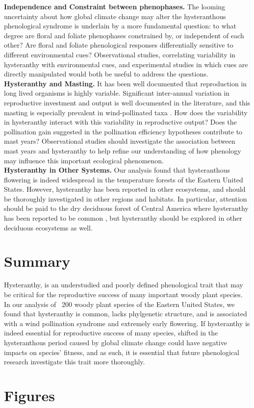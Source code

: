 \documentclass{article}
\begin{document}
\indent \textbf{Independence and Constraint between phenophases.} The looming uncertainty about how global climate change may alter the hysteranthous phenological syndrome is underlain by a more fundamental question: to what degree are floral and foliate phenophases constrained by, or independent of each other? Are floral and foliate phenological responses differentially sensitive to different environmental cues? Observational studies, correlating variability in hysteranthy with environmental cues, and experimental studies in which cues are directly manipulated would both be useful to address the questions.\\
\textbf{Hysteranthy and Masting.} It has been well documented that reproduction in long lived organisms is highly variable. Significant inter-annual variation in reproductive investment and output \citep{Bogdziewicz2017} is well documented in the literature, and this masting is especially prevalent in wind-pollinated taxa \citep{Kelly2001}. How does the variability in hysteranthy interact with this variability in reproductive output? Does the pollination gain suggested in the pollination efficiency hypotheses contribute to mast years? Observational studies should investigate the association between mast years and hysteranthy to help refine our understanding of how phenology may influence this important ecological phenomenon.\\
\indent \textbf{Hysteranthy in Other Systems.} Our analysis found that hysteranthous flowering is indeed widespread in the temperature forests of the Eastern United States. However, hysteranthy has been reported in other ecosystems, and should be thoroughly investigated in other regions and habitats. In particular, attention should be paid to the dry deciduous forest of Central America where hysteranthy has been reported to be common \citep{Janzen1967}, but hysteranthy should be explored in other deciduous ecosystems as well.\\
\section*{Summary}
\indent Hysteranthy, is an understudied and poorly defined phenological trait that may be critical for the reproductive success of many important woody plant species. In our analysis of ~200 woody plant species of the Eastern United States, we found that hysteranthy is common, lacks phylgenetic structure, and is associated with a wind pollination syndrome and extremely early flowering. If hysteranthy is indeed essential for reproductive success of many species, shifted in the hysteranthous period caused by global climate change could have negative impacts on species' fitness, and as such, it is essential that future phenological research investigate this trait more thoroughly.
\section*{Figures}


\end{document}
